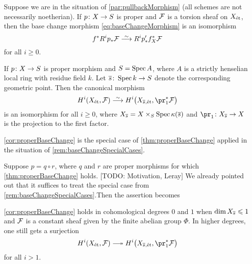 \documentclass[a4paper, 10pt, oneside, DIV=9, chapterprefix=true, numbers=enddot, bibliography=totoc]{scrbook}
\begin{document}
\begin{thm}\label{thm:properBaseChange}
	Suppose we are in the situation of \cref{par:pullbackMorphism} (all schemes are not necessarily noetherian). If $p\colon X\morphism S$ is proper and $\mathcal{F}$ is a torsion sheaf on $X_{\mathrm{\acute{e}t}}$, then the base change morphism \cref{eq:baseChangeMorphism} is an isomorphism
	\begin{equation*}
		f^*R^i p_*\Ff\isomorphism R^i p'_*f_X^*\Ff
	\end{equation*}
	for all $i\geq 0$.
\end{thm}
\begin{cor}\label{cor:properBaseChange}
	If $p\colon X\morphism S$ is proper morphism and $S=\operatorname{Spec} A$, where $A$ is a strictly henselian local ring with residue field $k$. Let $\ov{s}\colon \Spec k\morphism S$ denote the corresponding geometric point. Then the canonical morphism
	\begin{equation*}
		H^i(X_\et,\Ff)\isomorphism H^i\big(X_{\ov{s},\et},\pr_1^*\Ff\big)
	\end{equation*}
	is an isomorphism for all $i\geq 0$, where $X_{\ov{s}}=X\times_S\Spec \kappa(\ov{s})$ and $\pr_1\colon X_{\ov{s}}\morphism X$ is the projection to the first factor.
\end{cor}
\begin{fact}
	\begin{alphanumerate}
		\item \cref{cor:properBaseChange} is the special case of \cref{thm:properBaseChange} applied in the situation of \cref{rem:baseChangeSpecialCases}.
		\item Suppose $p=q\circ r$, where $q$ and $r$ are proper morphisms for which \cref{thm:properBaseChange} holds. [TODO: Motivation, Leray] We already pointed out that it suffices to treat the special case from \cref{rem:baseChangeSpecialCases}.Then the assertion becomes
	\end{alphanumerate}
\end{fact}
\begin{lem}
	\cref{cor:properBaseChange} holds in cohomological degrees $0$ and $1$ when $\dim X_{\ov{s}}\leq 1$ and $\mathcal{F}$ is a constant sheaf given by the finite abelian group $\Phi$. In higher degrees, one still gets a surjection
	\begin{equation*}
	H^i(X_\et,\Ff)\epimorphism H^i\big(X_{\ov{s},\et},\pr_1^*\Ff\big)
	\end{equation*}
	for all $i>1$.
\end{lem}
\fi

\appendix



\backmatter{}
\printbibliography[prenote=LINKS]
\end{document}
